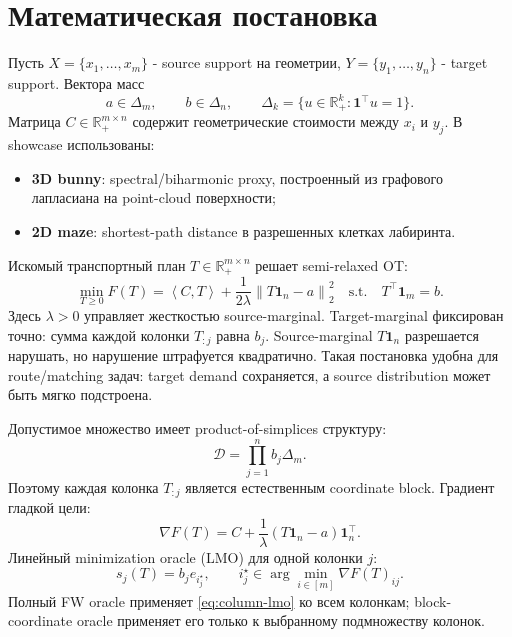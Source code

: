 \documentclass[11pt,a4paper]{article}
\newcommand{\R}{\mathbb{R}}
\newcommand{\one}{\mathbf{1}}
\newcommand{\DeltaSet}{\Delta}
\newcommand{\ip}[2]{\left\langle #1,#2 \right\rangle}
\newcommand{\norm}[1]{\left\lVert #1 \right\rVert}
\begin{document}
\section{Математическая постановка}

Пусть \(X=\{x_1,\dots,x_m\}\) - source support на геометрии, \(Y=\{y_1,\dots,y_n\}\) - target support. Вектора масс
\[
  a\in\DeltaSet_m,\qquad b\in\DeltaSet_n,\qquad
  \DeltaSet_k=\{u\in\R_+^k:\one^\top u=1\}.
\]
Матрица \(C\in\R_+^{m\times n}\) содержит геометрические стоимости между \(x_i\) и \(y_j\). В showcase использованы:
\begin{itemize}
  \item \textbf{3D bunny}: spectral/biharmonic proxy, построенный из графового лапласиана на point-cloud поверхности;
  \item \textbf{2D maze}: shortest-path distance в разрешенных клетках лабиринта.
\end{itemize}

Искомый транспортный план \(T\in\R_+^{m\times n}\) решает semi-relaxed OT:
\begin{equation}
  \label{eq:semi-relaxed-ot}
  \min_{T\ge 0}
  F(T)
  =
  \ip{C}{T}
  + \frac{1}{2\lambda}\norm{T\one_n-a}_2^2
  \quad
  \text{s.t.}\quad
  T^\top\one_m=b.
\end{equation}
Здесь \(\lambda>0\) управляет жесткостью source-marginal. Target-marginal фиксирован точно: сумма каждой колонки \(T_{:j}\) равна \(b_j\). Source-marginal \(T\one_n\) разрешается нарушать, но нарушение штрафуется квадратично. Такая постановка удобна для route/matching задач: target demand сохраняется, а source distribution может быть мягко подстроена.

Допустимое множество имеет product-of-simplices структуру:
\[
  \mathcal{D}
  =
  \prod_{j=1}^{n} b_j \DeltaSet_m.
\]
Поэтому каждая колонка \(T_{:j}\) является естественным coordinate block. Градиент гладкой цели:
\begin{equation}
  \label{eq:gradient}
  \nabla F(T)
  =
  C+\frac{1}{\lambda}(T\one_n-a)\one_n^\top.
\end{equation}
Линейный minimization oracle (LMO) для одной колонки \(j\):
\begin{equation}
  \label{eq:column-lmo}
  s_j(T)=b_j e_{i^\star_j},
  \qquad
  i^\star_j\in\arg\min_{i\in[m]} \nabla F(T)_{ij}.
\end{equation}
Полный FW oracle применяет \eqref{eq:column-lmo} ко всем колонкам; block-coordinate oracle применяет его только к выбранному подмножеству колонок.
\end{document}
